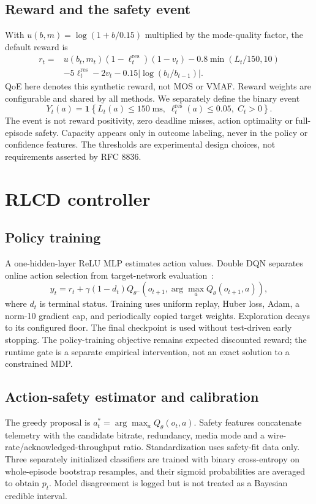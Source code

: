 \documentclass[10pt]{article}
\begin{document}
\subsection{Reward and the safety event}
With $u(b,m)=\log(1+b/0.15)$ multiplied by the mode-quality factor, the default reward is
\begin{align}
r_t={}&u(b_t,m_t)(1-\ell_t^{\mathrm{res}})(1-v_t)
 -0.8\min(L_t/150,10)\nonumber \\
 &-5\ell_t^{\mathrm{res}}-2v_t-0.15\left|\log(b_t/b_{t-1})\right|.
\end{align}
QoE here denotes this synthetic reward, not MOS or VMAF. Reward weights are configurable and shared by all methods. We separately define the binary event
\begin{equation}\label{eq:safety}
Y_t(a)=\mathbf{1}\left\{L_t(a)\leq150\;\mathrm{ms},\;\ell_t^{\mathrm{res}}(a)\leq0.05,\;C_t>0\right\}.
\end{equation}
The event is not reward positivity, zero deadline misses, action optimality or full-episode safety. Capacity appears only in outcome labeling, never in the policy or confidence features. The thresholds are experimental design choices, not requirements asserted by RFC 8836.

\section{RLCD controller}
\subsection{Policy training}
A one-hidden-layer ReLU MLP estimates action values. Double DQN separates online action selection from target-network evaluation~\cite{hasselt2016double}:
\begin{equation}
y_t=r_t+\gamma(1-d_t)Q_{\theta^-}\left(o_{t+1},\arg\max_a Q_{\theta}(o_{t+1},a)\right),
\end{equation}
where $d_t$ is terminal status. Training uses uniform replay, Huber loss, Adam, a norm-10 gradient cap, and periodically copied target weights. Exploration decays to its configured floor. The final checkpoint is used without test-driven early stopping. The policy-training objective remains expected discounted reward; the runtime gate is a separate empirical intervention, not an exact solution to a constrained MDP.

\subsection{Action-safety estimator and calibration}
The greedy proposal is $a_t^*=\arg\max_aQ_\theta(o_t,a)$. Safety features concatenate telemetry with the candidate bitrate, redundancy, media mode and a wire-rate/acknowledged-throughput ratio. Standardization uses safety-fit data only. Three separately initialized classifiers are trained with binary cross-entropy on whole-episode bootstrap resamples, and their sigmoid probabilities are averaged to obtain $p_t$. Model disagreement is logged but is not treated as a Bayesian credible interval.
\end{document}
